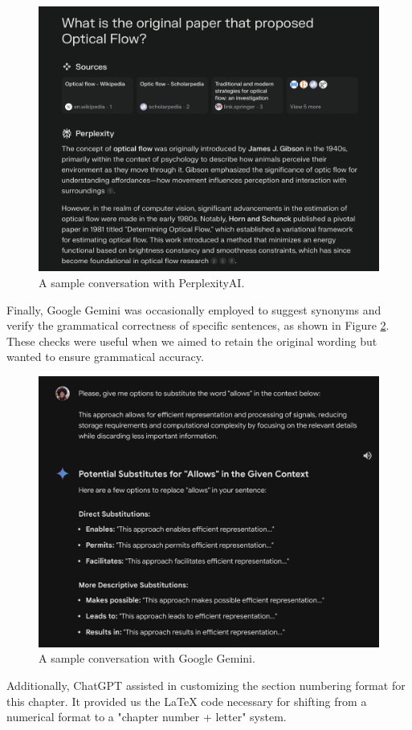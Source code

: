 \begin{figure}[!h]
    \centering
    \includegraphics[width=0.80\linewidth]{img/ch7/perplexity-refs.png}
    \caption{A sample conversation with PerplexityAI.} 
    \label{f:perplexity-opticalflow}
 \end{figure}

Finally, Google Gemini was occasionally employed to suggest synonyms and verify the grammatical correctness of specific sentences, as shown in Figure \ref{f:gemini-allows}. These checks were useful when we aimed to retain the original wording but wanted to ensure grammatical accuracy.

\begin{figure}[!h]
    \centering
    \includegraphics[width=0.80\linewidth]{img/ch7/gemini-allows.png}
    \caption{A sample conversation with Google Gemini.} 
    \label{f:gemini-allows}
 \end{figure}

Additionally, ChatGPT assisted in customizing the section numbering format for this chapter. It provided us the LaTeX code necessary for shifting from a numerical format to a "chapter number + letter" system.

\renewcommand{\thesection}{7.\arabic{section}}
\setcounter{section}{4}